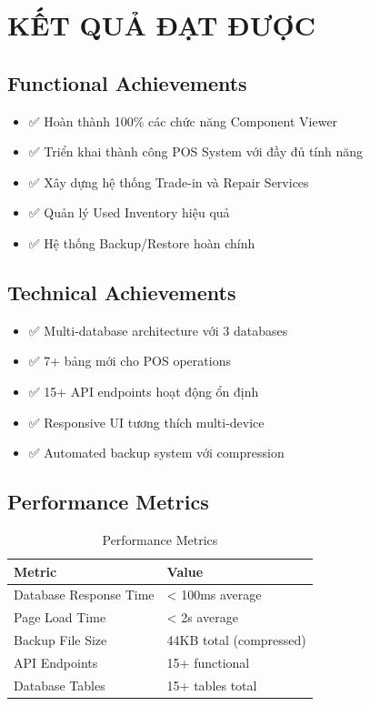 \documentclass[12pt,a4paper]{article}
\begin{document}
\section{KẾT QUẢ ĐẠT ĐƯỢC}

\subsection{Functional Achievements}
\begin{itemize}
    \item ✅ Hoàn thành 100\% các chức năng Component Viewer
    \item ✅ Triển khai thành công POS System với đầy đủ tính năng
    \item ✅ Xây dựng hệ thống Trade-in và Repair Services
    \item ✅ Quản lý Used Inventory hiệu quả
    \item ✅ Hệ thống Backup/Restore hoàn chính
\end{itemize}

\subsection{Technical Achievements}
\begin{itemize}
    \item ✅ Multi-database architecture với 3 databases
    \item ✅ 7+ bảng mới cho POS operations
    \item ✅ 15+ API endpoints hoạt động ổn định
    \item ✅ Responsive UI tương thích multi-device
    \item ✅ Automated backup system với compression
\end{itemize}

\subsection{Performance Metrics}
\begin{table}[h]
\centering
\begin{tabular}{@{}ll@{}}
\toprule
\textbf{Metric} & \textbf{Value} \\
\midrule
Database Response Time & < 100ms average \\
Page Load Time & < 2s average \\
Backup File Size & 44KB total (compressed) \\
API Endpoints & 15+ functional \\
Database Tables & 15+ tables total \\
\bottomrule
\end{tabular}
\caption{Performance Metrics}
\end{table}
\end{document}
